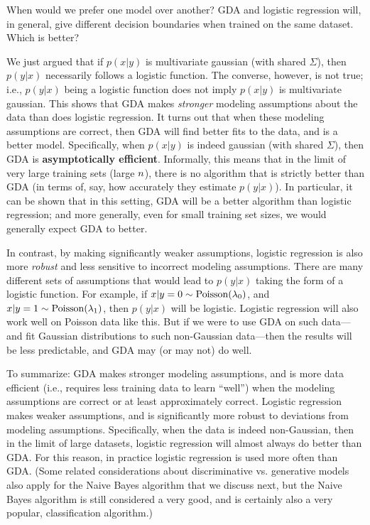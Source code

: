 \documentclass{article}
\begin{document}
When would we prefer one model over another?  GDA and logistic regression will,
in general, give different decision boundaries when trained on the same dataset. Which is better?

We just argued that if $p(x|y)$ is multivariate gaussian (with shared $\Sigma$),
then $p(y|x)$ necessarily follows a logistic function.  The converse, however,
is not true; i.e., $p(y|x)$ being a logistic function does not imply
$p(x|y)$ is multivariate gaussian.  This shows that GDA makes \emph{stronger} modeling assumptions
about the data than does logistic regression.  It turns out that when these modeling
assumptions are correct, then GDA will find better fits to the data, and is a better model.
Specifically, when $p(x|y)$ is indeed gaussian (with shared $\Sigma$), then GDA is
{\bf asymptotically efficient}.  Informally, this means that in the limit of very large
training sets (large ${n}$), there is no algorithm that is strictly better than GDA (in terms of,
say, how accurately they estimate $p(y|x)$).  In particular, it can be shown that in this
setting, GDA will be a better algorithm than logistic regression; and more generally,
even for small training set sizes, we would generally expect GDA to better.

In contrast, by making significantly weaker assumptions, logistic regression is also more
\emph{robust} and less sensitive to incorrect modeling assumptions.
There are many different sets of assumptions that would lead to $p(y|x)$ taking the form
of a logistic function.  For example, if
$x|y=0 \sim {\rm Poisson}(\lambda_0)$, and $x|y=1 \sim {\rm Poisson}(\lambda_1)$,
then $p(y|x)$ will be logistic.  Logistic regression will also work well on
Poisson data like this. But if we were to use GDA on such data---and fit Gaussian distributions to
such non-Gaussian data---then the results will be less predictable, and GDA may (or may not)
do well.

To summarize: GDA makes stronger modeling assumptions, and is more data efficient
(i.e., requires less training data to learn ``well'')
when the modeling assumptions are correct or at least approximately correct.  Logistic
regression makes weaker assumptions, and is significantly more robust to deviations
from modeling assumptions.  Specifically, when the data is indeed non-Gaussian, then
in the limit of large datasets, logistic regression will almost always do better than
GDA.  For this reason, in practice logistic regression is used more often than GDA.
(Some related considerations about discriminative vs.  generative models also apply for
the Naive Bayes algorithm that we discuss next, but the Naive Bayes algorithm is still
considered a very good, and is certainly also a very popular, classification algorithm.)
\end{document}
